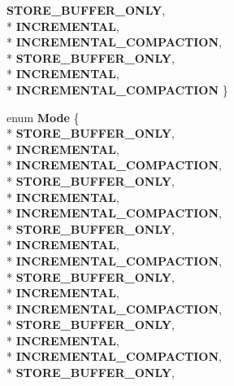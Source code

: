 \begin{DoxyCompactItemize}
{\bfseries S\+T\+O\+R\+E\+\_\+\+B\+U\+F\+F\+E\+R\+\_\+\+O\+N\+LY}, 
\\*
{\bfseries I\+N\+C\+R\+E\+M\+E\+N\+T\+AL}, 
\\*
{\bfseries I\+N\+C\+R\+E\+M\+E\+N\+T\+A\+L\+\_\+\+C\+O\+M\+P\+A\+C\+T\+I\+ON}, 
\\*
{\bfseries S\+T\+O\+R\+E\+\_\+\+B\+U\+F\+F\+E\+R\+\_\+\+O\+N\+LY}, 
\\*
{\bfseries I\+N\+C\+R\+E\+M\+E\+N\+T\+AL}, 
\\*
{\bfseries I\+N\+C\+R\+E\+M\+E\+N\+T\+A\+L\+\_\+\+C\+O\+M\+P\+A\+C\+T\+I\+ON}
 \}\hypertarget{classv8_1_1internal_1_1_record_write_stub_adaa3c49c2efe74f9d635fc17eb76aabe}{}\label{classv8_1_1internal_1_1_record_write_stub_adaa3c49c2efe74f9d635fc17eb76aabe}

\item 
enum {\bfseries Mode} \{ \\*
{\bfseries S\+T\+O\+R\+E\+\_\+\+B\+U\+F\+F\+E\+R\+\_\+\+O\+N\+LY}, 
\\*
{\bfseries I\+N\+C\+R\+E\+M\+E\+N\+T\+AL}, 
\\*
{\bfseries I\+N\+C\+R\+E\+M\+E\+N\+T\+A\+L\+\_\+\+C\+O\+M\+P\+A\+C\+T\+I\+ON}, 
\\*
{\bfseries S\+T\+O\+R\+E\+\_\+\+B\+U\+F\+F\+E\+R\+\_\+\+O\+N\+LY}, 
\\*
{\bfseries I\+N\+C\+R\+E\+M\+E\+N\+T\+AL}, 
\\*
{\bfseries I\+N\+C\+R\+E\+M\+E\+N\+T\+A\+L\+\_\+\+C\+O\+M\+P\+A\+C\+T\+I\+ON}, 
\\*
{\bfseries S\+T\+O\+R\+E\+\_\+\+B\+U\+F\+F\+E\+R\+\_\+\+O\+N\+LY}, 
\\*
{\bfseries I\+N\+C\+R\+E\+M\+E\+N\+T\+AL}, 
\\*
{\bfseries I\+N\+C\+R\+E\+M\+E\+N\+T\+A\+L\+\_\+\+C\+O\+M\+P\+A\+C\+T\+I\+ON}, 
\\*
{\bfseries S\+T\+O\+R\+E\+\_\+\+B\+U\+F\+F\+E\+R\+\_\+\+O\+N\+LY}, 
\\*
{\bfseries I\+N\+C\+R\+E\+M\+E\+N\+T\+AL}, 
\\*
{\bfseries I\+N\+C\+R\+E\+M\+E\+N\+T\+A\+L\+\_\+\+C\+O\+M\+P\+A\+C\+T\+I\+ON}, 
\\*
{\bfseries S\+T\+O\+R\+E\+\_\+\+B\+U\+F\+F\+E\+R\+\_\+\+O\+N\+LY}, 
\\*
{\bfseries I\+N\+C\+R\+E\+M\+E\+N\+T\+AL}, 
\\*
{\bfseries I\+N\+C\+R\+E\+M\+E\+N\+T\+A\+L\+\_\+\+C\+O\+M\+P\+A\+C\+T\+I\+ON}, 
\\*
{\bfseries S\+T\+O\+R\+E\+\_\+\+B\+U\+F\+F\+E\+R\+\_\+\+O\+N\+LY}, 

\end{DoxyCompactItemize}

